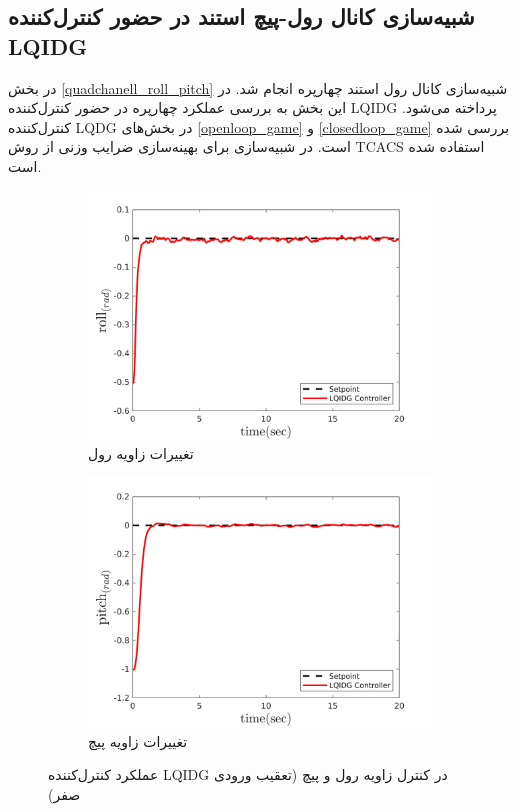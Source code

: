 \subsection{شبیه‌سازی کانال رول-پیچ استند در حضور کنترل‌کننده LQIDG}\label{roll_pitch_lqidg_section}
در بخش
\ref{quadchanell_roll_pitch}
شبیه‌سازی کانال رول استند چهارپره انجام شد. در این بخش به بررسی عملکرد چهارپره در حضور کنترل‌کننده LQIDG پرداخته می‌شود. کنترل‌کننده LQDG در بخش‌های
\ref{openloop_game}
و
\ref{closedloop_game}
بررسی شده است.
 در شبیه‌سازی برای بهینه‌سازی ضرایب وزنی از روش
TCACS \cite{Karimi2010}
استفاده شده است.
\begin{figure}
	\centering
	\begin{subfigure}
		\centering
		\includegraphics[width=12cm]{../Figures/MIL/LQIDG/Roll_Pitch/lqidg_roll.png}
		\caption{تغییرات زاویه رول}
	\end{subfigure}%
	\begin{subfigure}
		\centering
		\includegraphics[width=12cm]{../Figures/MIL/LQIDG/Roll_Pitch/lqidg_pitch.png}
		\caption{تغییرات زاویه پیچ}
	\end{subfigure}
	\caption{‫‪عملکرد کنترل‌کننده LQIDG در کنترل زاویه رول و پیچ (تعقیب ورودی صفر)}
\end{figure}


